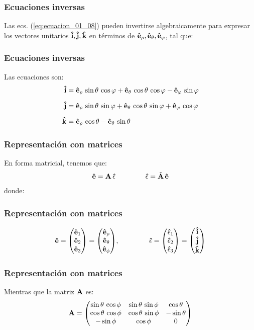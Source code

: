 \documentclass[12pt]{beamer}
\begin{document}
\begin{frame}
\frametitle{Ecuaciones inversas}
Las ecs. (\ref{eq:ecuacion_01_08}) pueden invertirse algebraicamente para expresar los vectores unitarios $\vu{i}, \vu{j}, \vu{k}$ en términos de $\vu{e}_{\rho}, \vu{e}_{\theta}, \vu{e}_{\varphi}$, tal que:
\end{frame}
\begin{frame}
\frametitle{Ecuaciones inversas}
Las ecuaciones son:
\pause
\begin{align*}
\vu{i} &= \vu{e}_{\rho} \, \sin \theta \, \cos \varphi + \vu{e}_{\theta} \, \cos \theta \, \cos \varphi - \vu{e}_{\varphi} \, \sin \varphi \\[0.5em]
\vu{j} &= \vu{e}_{\rho} \, \sin \theta \, \sin \varphi + \vu{e}_{\theta} \, \cos \theta \, \sin \varphi + \vu{e}_{\varphi} \, \cos \varphi \\[0.5em]
\vu{k} &= \vu{e}_{\rho} \, \cos \theta - \vu{e}_{\theta} \, \sin \theta
\end{align*}
\end{frame}
\begin{frame}
\frametitle{Representación con matrices}
En forma matricial, tenemos que:
\pause
\begin{align*}
\vu{e} = \vb{A} \, \vu{\epsilon} \hspace{1.5cm} \vu{\epsilon} = \tilde{\vb{A}} \, \vu{e}
\end{align*}
donde:
\end{frame}
\begin{frame}
\frametitle{Representación con matrices}
\begin{align*}
\vu{e} = \mqty(
\vu{e}_{1} \\
\vu{e}_{2} \\
\vu{e}_{3})
= \mqty(
\vu{e}_{\rho} \\
\vu{e}_{\theta} \\
\vu{e}_{\phi}), \hspace{1.5cm}
\vu{\epsilon} = \mqty(
\vu{\epsilon}_{1} \\
\vu{\epsilon}_{2} \\
\vu{\epsilon}_{3}) = \mqty(
\vu{i} \\
\vu{j} \\
\vu{k})
\end{align*}
\end{frame}
\begin{frame}
\frametitle{Representación con matrices}
Mientras que la matriz $\vb{A}$ es:
\pause
\begin{align*}
\vb{A} = \mqty(
\sin \theta \, \cos \phi & \sin \theta \, \sin \phi & \cos \theta \\
\cos \theta \, \cos \phi & \cos \theta \, \sin \phi & - \sin \theta \\
- \sin \phi & \cos \phi & 0
)
\end{align*}
\end{frame}
\end{document}
